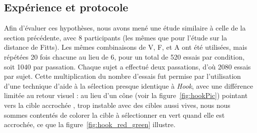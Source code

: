 	\subsection{Expérience et protocole}
	Afin d'évaluer ces hypothèses, nous avons mené une étude similaire à celle de la section précédente, avec 8 participants (les mêmes que pour l'étude sur la distance de Fitts). Les mêmes combinaisons de V, F, et A ont été utilisées, mais répétées 20 fois chacune au lieu de 6, pour un total de 520 essais par condition, soit 1040 par passation. Chaque sujet a effectué deux passations, d'où 2080 essais par sujet. Cette multiplication du nombre d'essais fut permise par l'utilisation d'une technique d'aide à la sélection presque identique à \emph{Hook}, avec une différence limitée au retour visuel : au lieu d'un cône (voir la figure~\ref{fig:hookPic}) pointant vers la cible \og accrochée \fg{}, trop instable avec des cibles aussi vives, nous nous sommes contentés de colorer la cible à sélectionner en vert quand elle est accrochée, ce que la figure~\ref{fig:hook_red_green} illustre.
	
